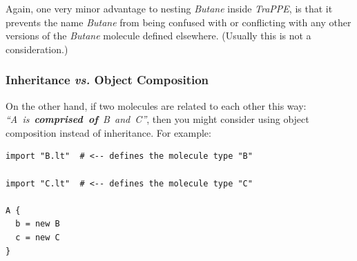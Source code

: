 \documentclass[11pt]{article}
\begin{document}
  Again, one very minor advantage to nesting 
\textit{Butane} inside \textit{TraPPE}, is that it prevents the name
\textit{Butane} from being confused with or conflicting with any other 
versions of the \textit{Butane} molecule defined elsewhere.
(Usually this is not a consideration.)

\subsubsection{Inheritance \textit{vs.} Object Composition}
\label{sec:inheritance_vs_object_composition}
On the other hand, if two molecules are related to each other this way:
\mbox{\textit{``A is \textbf{comprised of} B and C''}},
then you might consider using object composition instead of inheritance.
For example:
\begin{verbatim}
import "B.lt"  # <-- defines the molecule type "B"

import "C.lt"  # <-- defines the molecule type "C"

A {
  b = new B
  c = new C
}
\end{verbatim}





\end{document}
